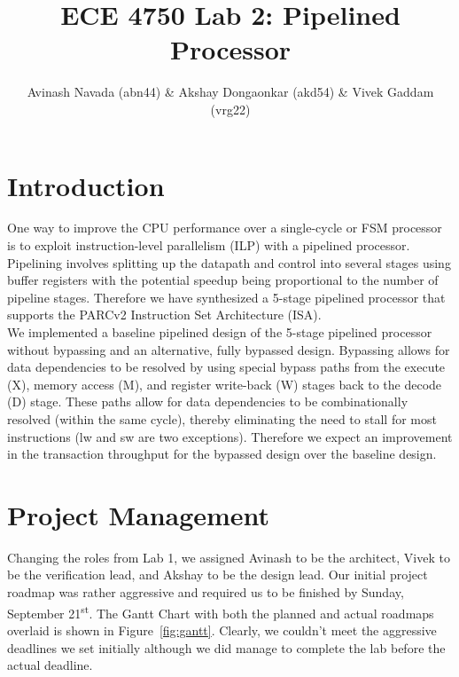 \documentclass[10pt]{article}
\begin{document}
\title{ECE 4750 Lab 2: Pipelined Processor}
\author{Avinash Navada (abn44) \& Akshay Dongaonkar (akd54) \& Vivek Gaddam (vrg22)}
\maketitle

\section{Introduction}

One way to improve the CPU performance over a single-cycle or FSM processor is to exploit
instruction-level parallelism (ILP) with a pipelined processor. Pipelining involves splitting up the
datapath and control into several stages using buffer registers with the potential speedup being
proportional to the number of pipeline stages. Therefore we have synthesized a 5-stage pipelined
processor that supports the PARCv2 Instruction Set Architecture (ISA). \\

We implemented a baseline pipelined design of the 5-stage pipelined processor without bypassing and an alternative, fully bypassed design. Bypassing allows for data dependencies to be resolved by using special bypass paths from the execute (X), memory access (M), and register write-back (W) stages back to the decode (D) stage. These paths allow for data dependencies to be combinationally resolved (within the same cycle), thereby eliminating the need to stall for most instructions (lw and sw are two exceptions). Therefore we expect an improvement in the transaction throughput for the bypassed design over the baseline design. 


\section{Project Management}

Changing the roles from Lab 1, we assigned Avinash to be the architect, Vivek to be the verification lead, and Akshay to be the design lead.
Our initial project roadmap was rather aggressive and required us to be finished by Sunday, September 21\textsuperscript{st}.
The Gantt Chart with both the planned and actual roadmaps overlaid is shown in Figure~\ref{fig:gantt}. Clearly, we couldn't meet the aggressive deadlines we set initially although we did manage to complete the lab before the actual deadline. \\
\end{document}
